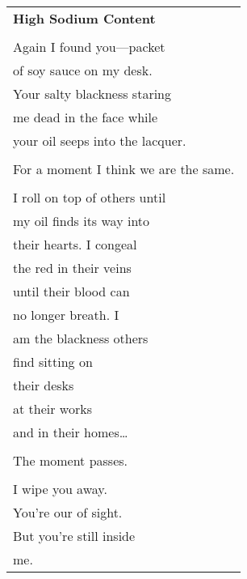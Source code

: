 \documentclass{article}
\begin{document}
\begin{center}
\begin{tabular}{l}
\textbf{High Sodium Content} \\
\\
Again I found you---packet \\
of soy sauce on my desk. \\
Your salty blackness staring \\
me dead in the face while \\
your oil seeps into the lacquer. \\
\\
For a moment I think we are the same. \\
\\
I roll on top of others until \\
my oil finds its way into \\
their hearts. I congeal \\
the red in their veins \\
until their blood can \\
no longer breath. I \\
am the blackness others \\
find sitting on \\
their desks \\
at their works \\
and in their homes\ldots{} \\
\\
The moment passes. \\
\\
I wipe you away. \\
You're our of sight. \\
But you're still inside \\
me.
\end{tabular}
\end{center}
\end{document}
